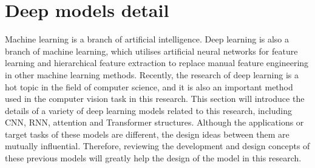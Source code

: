 \section{Deep models detail}
\label{sec:Deep models detail}
Machine learning is a branch of artificial intelligence. Deep learning is also a branch of machine learning, which utilises artificial neural networks for feature learning and hierarchical feature extraction to replace manual feature engineering in other machine learning methods.
Recently, the research of deep learning is a hot topic in the field of computer science, and it is also an important method used in the computer vision task in this research.
This section will introduce the details of a variety of deep learning models related to this research, including CNN, RNN, attention and Transformer structures.
Although the applications or target tasks of these models are different, the design ideas between them are mutually influential.
Therefore, reviewing the development and design concepts of these previous models will greatly help the design of the model in this research.




